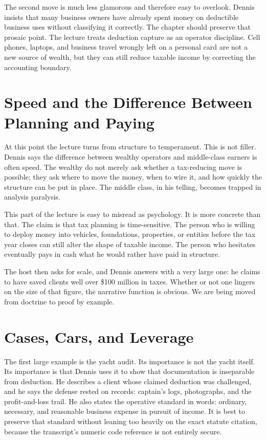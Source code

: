 The second move is much less glamorous and therefore easy to overlook. Dennis insists that many business owners have already spent money on deductible business uses without classifying it correctly. The chapter should preserve that prosaic point. The lecture treats deduction capture as an operator discipline. Cell phones, laptops, and business travel wrongly left on a personal card are not a new source of wealth, but they can still reduce taxable income by correcting the accounting boundary.

\section{Speed and the Difference Between Planning and Paying}

At this point the lecture turns from structure to temperament. This is not filler. Dennis says the difference between wealthy operators and middle-class earners is often speed. The wealthy do not merely ask whether a tax-reducing move is possible; they ask where to move the money, when to wire it, and how quickly the structure can be put in place. The middle class, in his telling, becomes trapped in analysis paralysis.

This part of the lecture is easy to misread as psychology. It is more concrete than that. The claim is that tax planning is time-sensitive. The person who is willing to deploy money into vehicles, foundations, properties, or entities before the tax year closes can still alter the shape of taxable income. The person who hesitates eventually pays in cash what he would rather have paid in structure.

The host then asks for scale, and Dennis answers with a very large one: he claims to have saved clients well over \$100 million in taxes. Whether or not one lingers on the size of that figure, the narrative function is obvious. We are being moved from doctrine to proof by example.

\section{Cases, Cars, and Leverage}

The first large example is the yacht audit. Its importance is not the yacht itself. Its importance is that Dennis uses it to show that documentation is inseparable from deduction. He describes a client whose claimed deduction was challenged, and he says the defense rested on records: captain's logs, photographs, and the profit-and-loss trail. He also states the operative standard in words: ordinary, necessary, and reasonable business expense in pursuit of income. It is best to preserve that standard without leaning too heavily on the exact statute citation, because the transcript's numeric code reference is not entirely secure.

